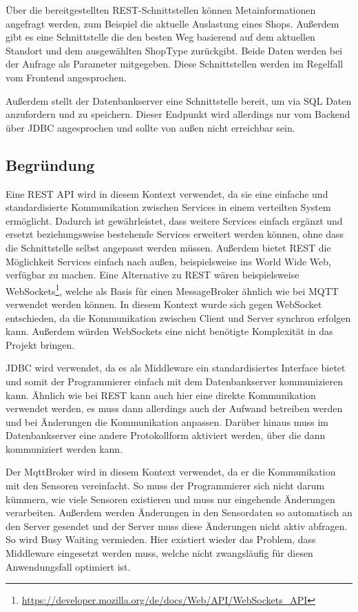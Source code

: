 \documentclass[runningheads]{llncs}
\begin{document}
Über die bereitgestellten REST-Schnittstellen können Metainformationen angefragt werden, zum Beispiel die aktuelle Auslastung eines Shops.
Außerdem gibt es eine Schnittstelle die den besten Weg basierend auf dem aktuellen Standort und dem ausgewählten ShopType zurückgibt.
Beide Daten werden bei der Anfrage als Parameter mitgegeben.
Diese Schnittstellen werden im Regelfall vom Frontend angesprochen.

Außerdem stellt der Datenbankserver eine Schnittstelle bereit, um via SQL Daten anzufordern und zu speichern.
Dieser Endpunkt wird allerdings nur vom Backend über JDBC angesprochen und sollte von außen nicht erreichbar sein.

\subsection{Begründung}
Eine REST API wird in diesem Kontext verwendet, da sie eine einfache und standardisierte Kommunikation zwischen Services in einem verteilten System ermöglicht.
Dadurch ist gewährleistet, dass weitere Services einfach ergänzt und ersetzt beziehungsweise bestehende Services erweitert werden können, ohne dass die Schnittstelle selbst angepasst werden müssen.
Außerdem bietet REST die Möglichkeit Services einfach nach außen, beispielsweise ins World Wide Web, verfügbar zu machen.
Eine Alternative zu REST wären beispielsweise WebSockets\footnote{\url{https://developer.mozilla.org/de/docs/Web/API/WebSockets\_API}}, welche als Basis für einen MessageBroker ähnlich wie bei MQTT verwendet werden können.
In diesem Kontext wurde sich gegen WebSocket entschieden, da die Kommunikation zwischen Client und Server synchron erfolgen kann.
Außerdem würden WebSockets eine nicht benötigte Komplexität in das Projekt bringen.

JDBC wird verwendet, da es als Middleware ein standardisiertes Interface bietet und somit der Programmierer einfach mit dem Datenbankserver kommunizieren kann.
Ähnlich wie bei REST kann auch hier eine direkte Kommunikation verwendet werden, es muss dann allerdings auch der Aufwand betreiben werden und bei Änderungen die Kommunikation anpassen.
Darüber hinaus muss im Datenbankserver eine andere Protokollform aktiviert werden, über die dann kommuniziert werden kann.

Der MqttBroker wird in diesem Kontext verwendet, da er die Kommunikation mit den Sensoren vereinfacht.
So muss der Programmierer sich nicht darum kümmern, wie viele Sensoren existieren und muss nur eingehende Änderungen verarbeiten.
Außerdem werden Änderungen in den Sensordaten so automatisch an den Server gesendet und der Server muss diese Änderungen nicht aktiv abfragen.
So wird Busy Waiting vermieden.
Hier existiert wieder das Problem, dass Middleware eingesetzt werden muss, welche nicht zwangsläufig für diesen Anwendungsfall optimiert ist.


\newpage


\end{document}
